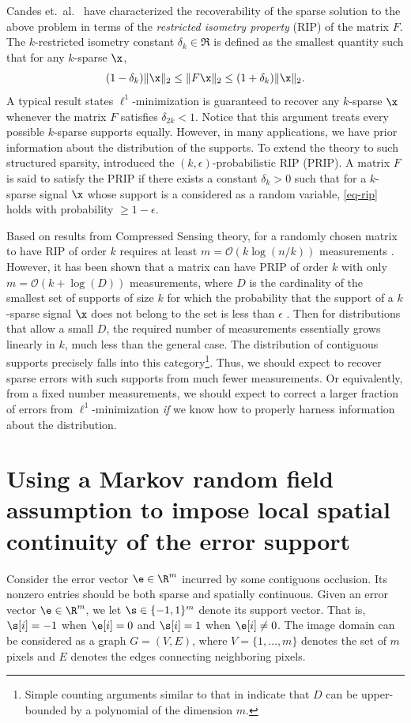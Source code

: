 Candes et.\ al.\ \cite{CandesE2005-IT} have characterized the recoverability of the sparse solution to the above problem in terms of the {\em restricted isometry property} (RIP) of the matrix $F$.
The $k$-restricted isometry constant $\delta_k \in \Re$ is defined as the smallest
quantity such that for any $k$-sparse $\x$,
\begin{equation}
(1-\delta_k)\|\x\|_2 \leq \|F\x\|_2 \leq (1+\delta_k)\|\x\|_2.
\label{eq-rip}
\end{equation}
A typical result states $\ell^1$-minimization is guaranteed to recover any $k$-sparse $\x$ whenever the matrix
$F$ satisfies $\delta_{2k}<1$. Notice that this argument treats every
possible $k$-sparse supports equally. However, in many
applications, we have prior information about the
distribution of the supports. To extend the theory to such
structured sparsity, \cite{Cevher2008-NIPS} introduced the
$(k,\epsilon)$-probabilistic RIP (PRIP). A matrix $F$ is said to
satisfy the PRIP if there exists a constant $\delta_k>0$ such that
for a $k$-sparse signal $\x$ whose support is a considered as a random variable, \eqref{eq-rip} holds with probability $\ge 1-\epsilon$.

Based on results from Compressed Sensing theory, for a randomly chosen matrix to have RIP of order $k$ requires at least $m =\mathcal{O}(k\log(n/k))$ measurements \cite{CandesE2005-IT}. However, it has been shown that a matrix can have PRIP of order $k$ with only $m =\mathcal {O}(k + \log(D))$ measurements, where $D$ is the cardinality of the smallest set of supports of size $k$ for which the probability that the support of a $k$-sparse signal $\x$ does not belong to the set is less than $\epsilon$ \cite{Cevher2008-NIPS}. Then for distributions that allow a small $D$, the required number of measurements essentially grows linearly in $k$, much less than the general case. The distribution of contiguous supports precisely falls into this category\footnote{Simple counting arguments similar to that in \cite{Cevher2008-NIPS} indicate that $D$ can be upper-bounded by a polynomial of the dimension $m$.}. Thus, we should expect to recover sparse errors with such supports from much fewer measurements. Or equivalently, from a fixed number measurements, we should expect to correct a larger fraction of errors from $\ell^1$-minimization {\em if} we know how to properly harness information about the distribution.

\section{Using a Markov random field assumption to impose local spatial continuity of the error support}
Consider the error vector $\e\in \R^m$ incurred by some contiguous occlusion. Its nonzero entries should be both sparse and spatially continuous. Given an error vector $\e\in \R^m$, we let $\s\in \{-1,1\}^m$ denote its
support vector. That is, $\s[i] = -1$ when $\e[i] = 0$ and $\s[i] = 1$
when $\e[i] \neq 0$. The image domain can be considered as a graph
$G=(V,E)$, where $V = \{1,\dots,m\}$ denotes the set of $m$
pixels and $E$ denotes the edges connecting neighboring pixels.

